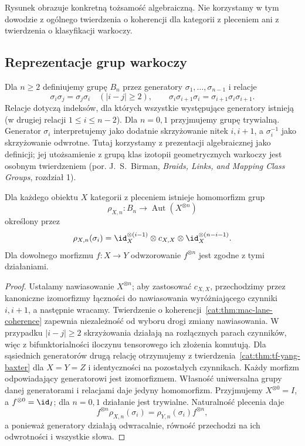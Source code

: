 Rysunek obrazuje konkretną tożsamość algebraiczną. Nie korzystamy w tym dowodzie z ogólnego twierdzenia o koherencji dla kategorii z pleceniem ani z twierdzenia o klasyfikacji warkoczy.

\subsection{Reprezentacje grup warkoczy}

\begin{definicja}\label{cat:def:tf-braid-group}
Dla $n\geq2$ definiujemy grupę $B_n$ przez generatory $\sigma_1,\ldots,\sigma_{n-1}$ i relacje
\[
 \sigma_i\sigma_j=\sigma_j\sigma_i\quad (|i-j|\geq2),
 \qquad
 \sigma_i\sigma_{i+1}\sigma_i=\sigma_{i+1}\sigma_i\sigma_{i+1}.
\]
Relacje dotyczą indeksów, dla których wszystkie występujące generatory istnieją (w drugiej relacji $1\leq i\leq n-2$). Dla $n=0,1$ przyjmujemy grupę trywialną. Generator $\sigma_i$ interpretujemy jako dodatnie skrzyżowanie nitek $i,i+1$, a $\sigma_i^{-1}$ jako skrzyżowanie odwrotne. Tutaj korzystamy z prezentacji algebraicznej jako definicji; jej utożsamienie z grupą klas izotopii geometrycznych warkoczy jest osobnym twierdzeniem (por. J.~S.~Birman, \emph{Braids, Links, and Mapping Class Groups}, rozdział 1).
\end{definicja}

\begin{twierdzenie}\label{cat:thm:tf-braid-action}
Dla każdego obiektu $X$ kategorii z pleceniem istnieje homomorfizm grup
\[
 \rho_{X,n}:B_n\longrightarrow\operatorname{Aut}(X^{\otimes n})
\]
określony przez
\[
 \rho_{X,n}(\sigma_i)
 =\id_X^{\otimes(i-1)}\otimes c_{X,X}\otimes
 \id_X^{\otimes(n-i-1)}.
\]
Dla dowolnego morfizmu $f:X\to Y$ odwzorowanie $f^{\otimes n}$ jest zgodne z tymi działaniami.
\end{twierdzenie}
\begin{proof}
Ustalamy nawiasowanie $X^{\otimes n}$; aby zastosować $c_{X,X}$, przechodzimy przez kanoniczne izomorfizmy łączności do nawiasowania wyróżniającego czynniki $i,i+1$, a następnie wracamy. Twierdzenie o koherencji~\ref{cat:thm:mac-lane-coherence} zapewnia niezależność od wyboru drogi zmiany nawiasowania. W przypadku $|i-j|\geq2$ skrzyżowania działają na rozłącznych parach czynników, więc z bifunktorialności iloczynu tensorowego ich złożenia komutują. Dla sąsiednich generatorów drugą relację otrzymujemy z twierdzenia~\ref{cat:thm:tf-yang-baxter} dla $X=Y=Z$ i identyczności na pozostałych czynnikach. Każdy morfizm odpowiadający generatorowi jest izomorfizmem. Własność uniwersalna grupy danej generatorami i relacjami daje jedyny homomorfizm. Przyjmujemy $X^{\otimes 0}=I$, a $f^{\otimes 0}=\id_I$; dla $n=0,1$ działanie jest trywialne. Naturalność plecenia daje
\[
 f^{\otimes n}\rho_{X,n}(\sigma_i)=
 \rho_{Y,n}(\sigma_i)f^{\otimes n},
\]
a ponieważ generatory działają odwracalnie, równość przechodzi na ich odwrotności i wszystkie słowa.
\end{proof}

